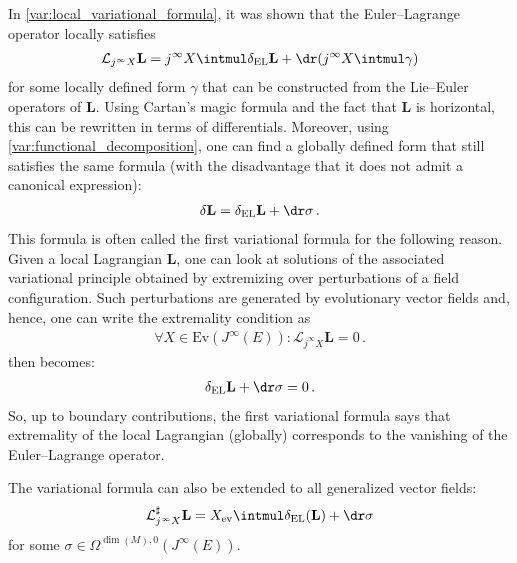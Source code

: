     \begin{property}
        In \cref{var:local_variational_formula}, it was shown that the Euler--Lagrange operator locally satisfies
        \begin{gather}
            \mathcal{L}_{j^\infty X}\mathbf{L} = j^\infty X\intmul\delta_{\text{EL}}\mathbf{L} + \dr(j^\infty X\intmul\gamma)
        \end{gather}
        for some locally defined form $\gamma$ that can be constructed from the Lie--Euler operators of $\mathbf{L}$. Using Cartan's magic formula and the fact that $\mathbf{L}$ is horizontal, this can be rewritten in terms of differentials. Moreover, using \cref{var:functional_decomposition}, one can find a globally defined form that still satisfies the same formula (with the disadvantage that it does not admit a canonical expression):
        \begin{gather}
            \label{var:first_variational_formula}
            \delta\mathbf{L} = \delta_{\text{EL}}\mathbf{L} + \dr\sigma\,.
        \end{gather}
        This formula is often called the first variational formula for the following reason. Given a local Lagrangian $\mathbf{L}$, one can look at solutions of the associated variational principle obtained by extremizing over perturbations of a field configuration. Such perturbations are generated by evolutionary vector fields and, hence, one can write the extremality condition as
        \begin{gather}
            \forall X\in\mathrm{Ev}(J^\infty(E)):\mathcal{L}_{j^\infty X}\mathbf{L} = 0\,.
        \end{gather}
         then becomes:
        \begin{gather}
            \delta_\mathrm{EL}\mathbf{L} + \dr\sigma = 0\,.
        \end{gather}
        So, up to boundary contributions, the first variational formula says that extremality of the local Lagrangian (globally) corresponds to the vanishing of the Euler--Lagrange operator.
    \end{property}
    \begin{result}\label{var:general_variational_formula}
        The variational formula can also be extended to all generalized vector fields:
        \begin{gather}
            \mathcal{L}^\sharp_{j^\infty X}\mathbf{L} = X_{\text{ev}}\intmul\delta_{\text{EL}}(\mathbf{L}) + \dr\sigma
        \end{gather}
        for some $\sigma\in\Omega^{\dim(M),0}(J^\infty(E))$.
    \end{result}

